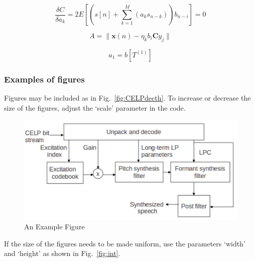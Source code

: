 \begin{equation}
\frac{\delta C}{\delta a_{k}} = 2E[(s[n] + \sum\limits_{k=1}^M (a_{k}s_{n-k}))b_{n-i}] = 0
  \label{eq:dC}
  \end{equation}

\begin{equation}
A=\lVert \mathbf{x}(n) - \eta_{k}b_{i}\mathbf{C}y_j \rVert 
  \label{eq:Alvert}
  \end{equation}

\begin{equation}
  a_{1}= b[T^{(1)}]
  \label{eq:vs1}
  \end{equation}

\subsubsection{Examples of figures}

\indent Figures may be included as in Fig.~\ref{fig:CELPdecth}. To increase or decrease the size of the figures, adjust the `scale' parameter in the code. 
\begin{figure}[h]
      \begin{center}
                 \includegraphics[scale=.55]{CELPdecth-eps-converted-to.pdf}
                 \caption[An Example Figure]{An Example Figure}
      \end{center}
\end{figure}

\indent If the size of the figures needs to be made uniform, use the parameters `width' and `height' as shown in Fig.~\ref{fig:int}.

